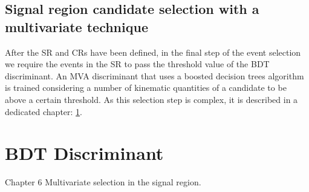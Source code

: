\subsection{Signal region candidate selection with a multivariate technique}

After the SR and CRs have been defined, in the final step of the event selection we require the events in the SR to pass the threshold value of the BDT discriminant. An MVA discriminant that uses a boosted decision trees algorithm is trained considering a number of kinematic quantities of a candidate to be above a certain threshold. As this selection step is complex, it is described in a dedicated chapter: \ref{sec:BDT}.










\section{BDT Discriminant}
\label{sec:BDT}


Chapter 6 Multivariate selection in the signal region.



